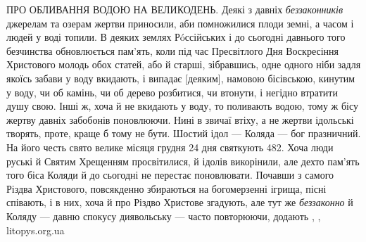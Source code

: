 ПРО ОБЛИВАННЯ ВОДОЮ НА ВЕЛИКОДЕНЬ. Деякі з давніх \emph{беззаконників} джерелам
та озерам жертви приносили, аби помножилися плоди земні, а часом і людей у воді
топили. В деяких землях Рóссійських і до сьогодні давнього того безчинства
обновлюється пам’ять, коли під час Пресвітлого Дня Воскресіння Христового
молодь обох статей, або й старші, зібравшись, одне одного ніби задля якоїсь
забави у воду вкидають, і випадає [деяким], намовою бісівською, кинутим у воду,
чи об камінь, чи об дерево розбитися, чи втонути, і негідно втратити душу свою.
Інші ж, хоча й не вкидають у воду, то поливають водою, тому ж бісу жертву
давніх забобонів поновлюючи. Нині в звичаї втіху, а не жертви ідольські
творять, проте, краще б тому не бути.  Шостий ідол — Коляда — бог празничний.
На його честь свято велике місяця грудня 24 дня святкують 482. Хоча люди руські
й Святим Хрещенням просвітилися, й ідолів викорінили, але дехто пам’ять того
біса Коляди й до сьогодні не перестає поновлювати. Почавши з самого Різдва
Христового, повсякденно збираються на богомерзенні ігрища, пісні співають, і в
них, хоча й про Різдво Христове згадують, але тут же \emph{беззаконно} й Коляду
— давню спокусу диявольську — часто повторюючи, додають
, , litopys.org.ua 
